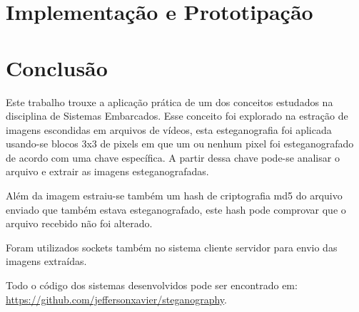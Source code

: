 \documentclass[journal,transmag]{IEEEtran}
\begin{document}
\section{Implementação e Prototipação}

\section{Conclusão}

Este trabalho trouxe a aplicação prática de um dos conceitos estudados na disciplina de Sistemas Embarcados. Esse conceito foi explorado na estração de imagens escondidas em arquivos de vídeos, esta esteganografia foi aplicada usando-se blocos 3x3 de pixels em que um ou nenhum pixel foi esteganografado de acordo com uma chave específica. A partir dessa chave pode-se analisar o arquivo e extrair as imagens esteganografadas.

Além da imagem estraiu-se também um hash de criptografia md5 do arquivo enviado que também estava esteganografado, este hash pode comprovar que o arquivo recebido não foi alterado.

Foram utilizados sockets também no sistema cliente servidor para envio das imagens extraídas.

Todo o código dos sistemas desenvolvidos pode ser encontrado em: \url{https://github.com/jeffersonxavier/steganography}.
\end{document}
